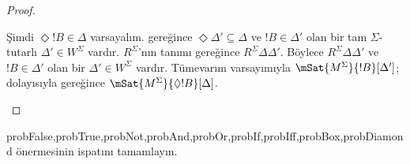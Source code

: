 \documentclass[../../../include/open-logic-section]{subfiles}
\begin{document}
\begin{proof}
\begin{enumerate}
{{{          Şimdi $\Diamond!B\in\Delta$ varsayalım.
           gereğince
          $\Diamond\Delta'\subseteq\Delta$ ve $!B\in\Delta'$ olan bir tam
          $\Sigma$-tutarlı $\Delta'\in W^\Sigma$ vardır.
           $R^\Sigma$'nın tanımı
          gereğince $R^\Sigma\Delta\Delta'$. Böylece
          $R^\Sigma\Delta\Delta'$ ve $!B\in\Delta'$ olan bir
          $\Delta'\in W^\Sigma$ vardır. Tümevarım varsayımıyla
          $\mSat{M^\Sigma}{!B}[\Delta']$; dolayısıyla
           gereğince
          $\mSat{M^\Sigma}{\Diamond!B}[\Delta]$.}}}{}
  \end{enumerate}
\end{proof}

\begin{probtag}{probFalse,probTrue,probNot,probAnd,probOr,probIf,probIff,probBox,probDiamond}
   önermesinin ispatını tamamlayın.
\end{probtag}
\end{document}
